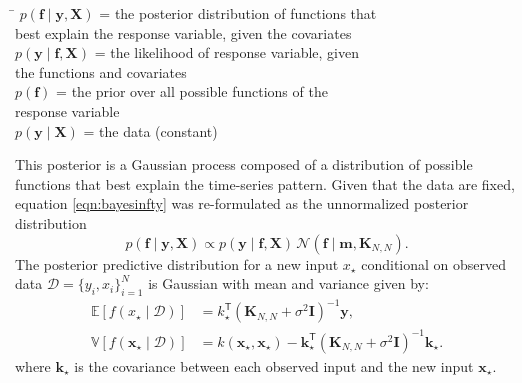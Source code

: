 \documentclass[letterpaper]{article}
\begin{document}
\begin{center} 
\begin{minipage}{10cm} 
\begin{tabbing}
\= \kill
$p(\textbf{f}\mid \textbf{y},\textbf{X})$ = the posterior distribution of functions that\\ best explain the response variable, given the covariates \\
$p(\textbf{y} \mid \textbf{f}, \textbf{X})$ = the likelihood of response variable, given\\ the functions and covariates \\ 
$p(\textbf{f})$ = the prior over all possible functions of the\\ response variable \\
$p(\textbf{y} \mid \textbf{X})$ = the data (constant)
\end{tabbing}
\end{minipage} 
\end{center}
This posterior is a Gaussian process composed of a distribution of possible functions that best explain the time-series pattern. Given that the data are fixed, equation \eqref{eqn:bayesinfty} was re-formulated as the unnormalized posterior distribution
\begin{equation}\label{eqn:bayesinfty-unormalized}
p(\textbf{f} \mid \textbf{y},\textbf{X}) \propto p(\textbf{y} \mid \textbf{f}, \textbf{X}) \, \mathcal{N}(\textbf{f} \mid \textbf{m}, \textbf{K}_{N,N}).
\end{equation}
The posterior predictive distribution for a new input $x_{\star}$ conditional on observed data $\mathscr{D} = \{y_i, x_i\}_{i=1}^{N}$ is Gaussian with mean and variance given by:
\begin{align}
\mathbb{E}[f(x_{\star} \mid \mathscr{D})] &=k_{\star}^{\mathsf{T}}(\textbf{K}_{N,N}+\sigma^2\textbf{I})^{-1}\textbf{y}, \label{eqn:mean-predict}\\
\mathbb{V}[f(\textbf{x}_{\star} \mid \mathscr{D})] &=k(\textbf{x}_{\star}, \textbf{x}_{\star})-\textbf{k}_{\star}^{\mathsf{T}}(\textbf{K}_{N,N}+\sigma^2\textbf{I})^{-1}\textbf{k}_{\star} \label{eqn:kernel-predict}.
\end{align}
where $\textbf{k}_{\star}$ is the covariance between each observed input and the new input $\textbf{x}_{\star}$.
\end{document}
